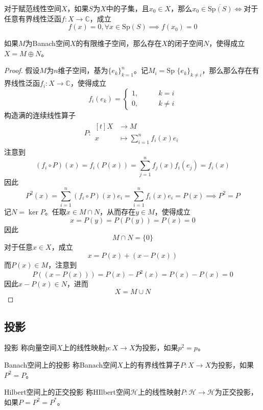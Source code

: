 \documentclass[lang = cn, scheme = chinese, thmcnt = section]{elegantbook}
\newcommand{\C}{\mathbb{C}}  		   %
\begin{document}
\begin{corollary}
	对于赋范线性空间$X$，如果$S$为$X$中的子集，且$x_0\in X$，那么$x_0\in\overline{\text{Sp}(S)}\iff$对于任意有界线性泛函$f:X\to\C$​，成立
	$$
	f(x)=0,\forall x\in \text{Sp}(S)\implies f(x_0)=0
	$$
\end{corollary}

\begin{proposition}
	如果$M$为Banach空间$X$的有限维子空间，那么存在$X$的闭子空间$N$，使得成立$X=M\oplus N$。
\end{proposition}

\begin{proof}
	假设$M$为$n$维子空间，基为$\{ e_k \}_{k=1}^n$。记$M_i=\text{Sp }\{e_k\}_{k\ne i}$，那么那么存在有界线性泛函$f_i:X\to\C$​，使得成立
	$$
	f_i(e_k)=\begin{cases}
		1,\qquad & k=i\\
		0,\qquad & k\ne i
	\end{cases}
	$$
	构造满的连续线性算子
	\begin{align*}
		P:\begin{aligned}[t]
			X&\longrightarrow M\\
			x&\longmapsto \sum_{i=1}^{n}f_i(x)e_i
		\end{aligned}
	\end{align*}
	注意到
	$$
	(f_i\circ P)(x)=f_i(P(x))=\sum_{j=1}^{n}f_j(x)f_i(e_j)=f_i(x)
	$$
	因此
	$$
	P^2(x)=\sum_{i=1}^{n}(f_i\circ P)(x)e_i=\sum_{i=1}^{n}f_i(x)e_i=P(x)\implies P^2=P
	$$
	记$N=\ker P$。任取$x\in M\cap N$，从而存在$y\in M$，使得成立
	$$
	x=P(y)=P(P(y))=P(x)=0
	$$
	因此
	$$
	M\cap N=\{0\}
	$$
	对于任意$x\in X$，成立
	$$
	x=P(x)+(x-P(x))
	$$
	而$P(x)\in M$，注意到
	$$
	P((x-P(x)))=P(x)-P^2(x)=P(x)-P(x)=0
	$$
	因此$x-P(x)\in N$，进而
	$$
	X=M\cup N
	$$
\end{proof}

\subsection{投影}

\begin{definition}{投影}
	称向量空间$X$上的线性映射$p:X\to X$为投影，如果$p^2=p$。
\end{definition}

\begin{definition}{Banach空间上的投影}
	称Banach空间$X$上的有界线性算子$P:X\to X$为投影，如果$P^2=P$。
\end{definition}

\begin{definition}{Hilbert空间上的正交投影}
	称HIlbert空间$\mathcal{H}$上的线性映射$P:\mathcal{H}\to \mathcal{H}$为正交投影，如果$P=P^2=P^*$。
\end{definition}
\end{document}
